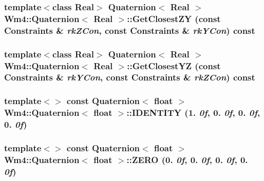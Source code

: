 \subsubsection{\setlength{\rightskip}{0pt plus 5cm}template$<$class Real$>$ {\bf Quaternion}$<$ Real $>$ {\bf Wm4::Quaternion}$<$ Real $>$::Get\-Closest\-ZY (const {\bf Constraints} \& {\em rk\-ZCon}, const {\bf Constraints} \& {\em rk\-YCon}) const}\label{classWm4_1_1Quaternion_5beef9c556c27d8d981b5fc3fa9fdc34}


\subsubsection{\setlength{\rightskip}{0pt plus 5cm}template$<$class Real$>$ {\bf Quaternion}$<$ Real $>$ {\bf Wm4::Quaternion}$<$ Real $>$::Get\-Closest\-YZ (const {\bf Constraints} \& {\em rk\-YCon}, const {\bf Constraints} \& {\em rk\-ZCon}) const}\label{classWm4_1_1Quaternion_b9a245bad213a6ce5d8c35b2d4d48713}


\subsubsection{\setlength{\rightskip}{0pt plus 5cm}template$<$$>$ const {\bf Quaternion}$<$ float $>$ {\bf Wm4::Quaternion}$<$ float $>$::{\bf IDENTITY} (1. {\em 0f}, 0. {\em 0f}, 0. {\em 0f}, 0. {\em 0f})}\label{classWm4_1_1Quaternion_59288027790584fccd5c54d57a5589a2}


\subsubsection{\setlength{\rightskip}{0pt plus 5cm}template$<$$>$ const {\bf Quaternion}$<$ float $>$ {\bf Wm4::Quaternion}$<$ float $>$::{\bf ZERO} (0. {\em 0f}, 0. {\em 0f}, 0. {\em 0f}, 0. {\em 0f})}\label{classWm4_1_1Quaternion_ec90a2e0a977224b68532f33304de2f3}


